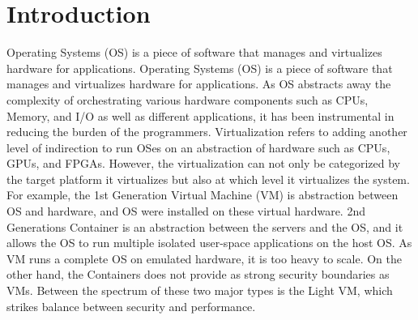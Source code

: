 \section{Introduction}
\label{sec:intro}
%
Operating Systems (OS) is a piece of software that manages and virtualizes hardware for applications.
%
Operating Systems (OS) is a piece of software that manages and virtualizes hardware for applications.
%
As OS abstracts away the complexity of orchestrating various hardware components such as CPUs, Memory, and I/O as well as different applications, it has been instrumental in reducing the burden of the programmers.
%
Virtualization refers to adding another level of indirection to run OSes on an abstraction of hardware such as CPUs, GPUs, and FPGAs.
%
However, the virtualization can not only be categorized by the target platform it virtualizes but also at which level it virtualizes the system.
%
For example, the 1st Generation Virtual Machine (VM) is abstraction between OS and hardware, and OS were installed on these virtual hardware.
%
2nd Generations Container is an abstraction between the servers and the OS, and it allows the OS to run multiple isolated user-space applications on the host OS.
%
As VM runs a complete OS on emulated hardware, it is too heavy to scale.
%
On the other hand, the Containers does not provide as strong security boundaries as VMs.
%
Between the spectrum of these two major types is the Light VM, which strikes balance between security and performance.